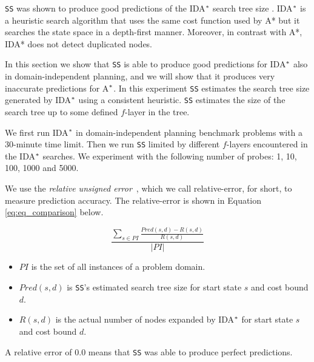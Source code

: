 \noindent
\texttt{SS} was shown to produce good predictions of the IDA$\sp{*}$ search tree size \cite{lelis2013predicting}. IDA$\sp{*}$ is a heuristic search algorithm that uses the same cost function used by A* but it searches the state space in a depth-first manner. Moreover, in contrast with A*, IDA* does not detect duplicated nodes.

 
In this section we show that \texttt{SS} is able to produce good predictions for IDA$\sp{*}$ also in domain-independent planning, and we will show that it produces very inaccurate predictions for A$\sp{*}$. In this experiment \texttt{SS} estimates the search tree size generated by IDA$\sp{*}$ using a consistent heuristic. \texttt{SS} estimates the size of the search tree up to some defined $f$-layer in the tree.

We first run IDA$\sp{*}$ in domain-independent planning benchmark problems with a 30-minute time limit. Then we run \texttt{SS} limited by different $f$-layers encountered in the IDA$\sp{*}$ searches. We experiment with the following number of probes: 1, 10, 100, 1000 and 5000.

We use the \textit{relative unsigned error}~\cite{lelis2012fast}, which we call relative-error, for short, to measure prediction accuracy. The relative-error is shown in Equation \ref{eq:eq_comparison} below.

\begin{equation}
\frac{\sum_{s\in PI} \frac{Pred(s, d) - R(s, d)}{R(s, d)}}{|PI|}
\label{eq:eq_comparison}
\end{equation}

\begin{itemize}
  \item $PI$ is the set of all instances of a problem domain.
  \item $Pred(s,d)$ is \texttt{SS}'s estimated search tree size for start state $s$ and cost bound $d$.
  \item $R(s,d)$ is the actual number of nodes expanded by IDA$\sp{*}$ for start state $s$ and cost bound $d$.
\end{itemize}
A relative error of 0.0 means that \texttt{SS} was able to produce perfect predictions.

